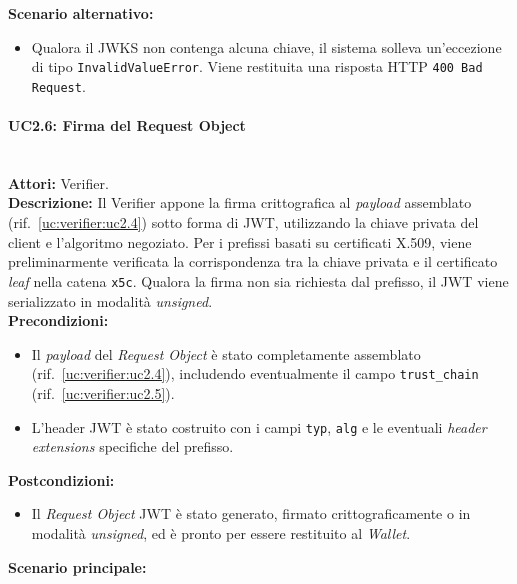 \noindent\textbf{Scenario alternativo:}
\begin{itemize}
    \item Qualora il JWKS non contenga alcuna chiave, il sistema solleva un'eccezione di tipo \texttt{InvalidValueError}. Viene restituita una risposta HTTP \texttt{400 Bad Request}.
\end{itemize}

\paragraph{\large\bfseries UC2.6: Firma del Request Object}
\label{uc:verifier:uc2.6}
\mbox{}\\
\noindent\textbf{Attori:} Verifier.
\\
\noindent\textbf{Descrizione:} Il Verifier appone la firma crittografica al \textit{payload} assemblato (rif.\ \ref{uc:verifier:uc2.4}) sotto forma di JWT, utilizzando la chiave privata del client e l'algoritmo negoziato. Per i prefissi basati su certificati X.509, viene preliminarmente verificata la corrispondenza tra la chiave privata e il certificato \textit{leaf} nella catena \texttt{x5c}. Qualora la firma non sia richiesta dal prefisso, il JWT viene serializzato in modalità \textit{unsigned}.
\\
\noindent\textbf{Precondizioni:}
\begin{itemize}
    \item Il \textit{payload} del \textit{Request Object} è stato completamente assemblato (rif.\ \ref{uc:verifier:uc2.4}), includendo eventualmente il campo \texttt{trust\_\allowbreak{}chain} (rif.\ \ref{uc:verifier:uc2.5}).
    \item L'header JWT è stato costruito con i campi \texttt{typ}, \texttt{alg} e le eventuali \textit{header extensions} specifiche del prefisso.
\end{itemize}
\noindent\textbf{Postcondizioni:}
\begin{itemize}
    \item Il \textit{Request Object} JWT è stato generato, firmato crittograficamente o in modalità \textit{unsigned}, ed è pronto per essere restituito al \textit{Wallet}.
\end{itemize}
\noindent\textbf{Scenario principale:}
